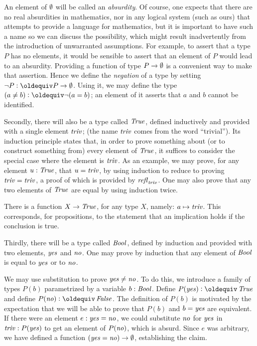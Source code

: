 An element of $\emptyset$ will be called an \emph{absurdity}.  Of course, one expects that there are no real absurdities in mathematics, nor in any
logical system (such as ours) that attempts to provide a language for mathematics, but it is important to have such a name so we can discuss
the possibility, which might result inadvertently from the introduction of unwarranted assumptions.  For example, to assert that a type $P$ has
no elements, it would be sensible to assert that an element of $P$ would lead to an absurdity.  Providing a function of type $P \to \emptyset$ is a
convenient way to make that assertion.  Hence we define the {\em negation} of a type by setting $\neg P \defeq P \to \emptytype$.  Using it, we
may define the type $(a \ne b) \defeq \neg (a = b)$; an element of it asserts that $a$ and $b$ cannot be identified.

Secondly, there will also be a type called $\mathop{\mathit{True}}$, defined inductively and provided with a single element $\mathop{\mathit{triv}}$; (the name $\mathop{\mathit{triv}}$ comes from the word
  ``trivial'').  Its induction principle
states that, in order to prove something about (or to construct something from) every element of $\mathop{\mathit{True}}$, it suffices to consider the special
case where the element is $\mathop{\mathit{triv}}$.  As an example, we may prove, for any element $u : \mathop{\mathit{True}}$, that $u=\mathop{\mathit{triv}}$, by using induction to reduce
to proving $\mathop{\mathit{triv}}=\mathop{\mathit{triv}}$, a proof of which is provided by $\mathop{{\it refl}_{\mathop{\mathit{triv}}}}$.  One may also prove that any two elements of $\mathop{\mathit{True}}$ are equal by using induction twice.

There is a function $X \to \mathop{\mathit{True}}$, for any type $X$, namely: $a \mapsto \mathop{\mathit{triv}}$.  This corresponds, for propositions, to the statement that an
implication holds if the conclusion is true.

Thirdly, there will be a type called $\mathop{\mathit{Bool}}$, 
defined by induction and provided with two elements, $\mathop{\mathit{yes}}$ and $\mathop{\mathit{no}}$.  
One may prove by induction
that any element of $\mathop{\mathit{Bool}}$ is equal to $\mathop{\mathit{yes}}$ or to $\mathop{\mathit{no}}$.

We may use substitution to prove $\mathop{\mathit{yes}} \ne \mathop{\mathit{no}}$.  To do this, we introduce a family of types $P(b)$ parametrized by a variable $b:\mathop{\mathit{Bool}}$.
Define $P(\yes) \defeq \true$ and define $P(\no) \defeq \false$.  The definition of $P(b)$ is motivated by the expectation that we will be able
to prove that $P(b)$ and $b = \mathop{\mathit{yes}}$ are equivalent.  If there were an element $e: \mathop{\mathit{yes}} = \mathop{\mathit{no}}$, we could substitute $\mathop{\mathit{no}}$ for $\mathop{\mathit{yes}}$ in $\mathop{\mathit{triv}} :
P (\mathop{\mathit{yes}})$ to get an element of $P(\mathop{\mathit{no}})$, which is absurd.  Since $e$ was arbitrary, we have defined a function $(\mathop{\mathit{yes}}=\mathop{\mathit{no}}) \to \emptyset$,
establishing the claim.

